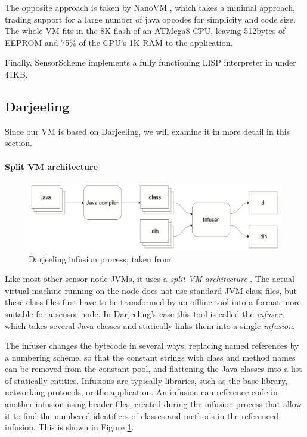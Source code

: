 The opposite approach is taken by NanoVM \cite{Harbaum}, which takes a minimal approach, trading support for a large number of java opcodes for simplicity and code size. The whole VM fits in the 8K flash of an ATMega8 CPU, leaving 512bytes of EEPROM and 75\% of the CPU’s 1K RAM to the application.

Finally, SensorScheme \cite{Evers:2010ur} implements a fully functioning LISP interpreter in under 41KB.

\subsection{Darjeeling}
Since our VM is based on Darjeeling, we will examine it in more detail in this section.

\paragraph{Split VM architecture}
\begin{figure}[H]
	\centering
	\includegraphics[width=0.6\linewidth]{darjeeling-infusion-process}
	\caption{Darjeeling infusion process, taken from \cite{Brouwers:2009cj}}
	\label{fig-darjeeling-infusion-process}
\end{figure}
Like most other sensor node JVMs, it uses a \emph{split VM architecture} \cite{Simon:2006wd}. The actual virtual machine running on the node does not use standard JVM class files, but these class files first have to be transformed by an offline tool into a format more suitable for a sensor node. In Darjeeling's case this tool is called the \emph{infuser}, which takes several Java classes and statically links them into a single \emph{infusion}.

The infuser changes the bytecode in several ways, replacing named references by a numbering scheme, so that the constant strings with class and method names can be removed from the constant pool, and flattening the Java classes into a list of statically entities. Infusions are typically libraries, such as the  base library, networking protocols, or the application. An infusion can reference code in another infusion using header files, created during the infusion process that allow it to find the numbered identifiers of classes and methods in the referenced infusion. This is shown in Figure \ref{fig-darjeeling-infusion-process}.

